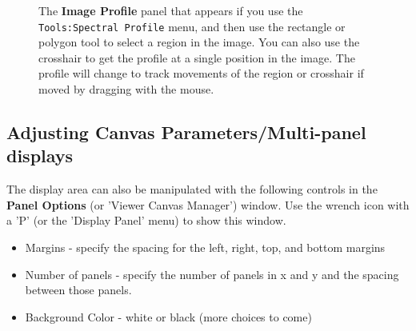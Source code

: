 \begin{figure}[h!]
\caption{\label{fig:viewer_specprof} The {\bf Image Profile} panel
that appears if you use the {\tt Tools:Spectral Profile} menu,
and then use the rectangle or polygon tool to select a region in the image.
You can also use the crosshair to get the profile at a single
position in the image.  The profile will change to track movements
of the region or crosshair if moved by dragging with the mouse.} 
\hrulefill
\end{figure}




% 

\subsection{Adjusting Canvas Parameters/Multi-panel displays}
\label{section:display.viewerGUI.canvas}

The display area can also be manipulated with the following controls in
the {\bf Panel Options} (or 'Viewer Canvas Manager') window.
Use the wrench icon with a 'P' (or the 'Display Panel' menu) to show this
window.
\begin{itemize}
   \item Margins - specify the spacing for the left, right, top, and bottom margins
   \item Number of panels - specify the number of panels in x and y
         and the spacing between those panels.
   \item Background Color - white or black (more choices to come)
\end{itemize}

